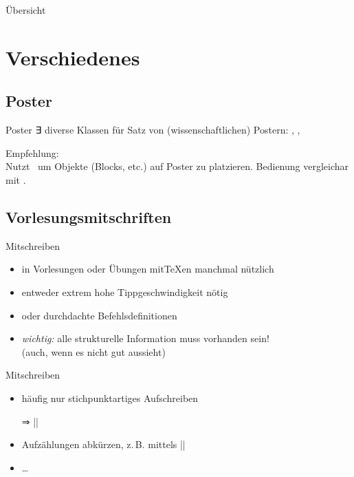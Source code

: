 \documentclass[
	vorläufig=false,
	datum=2022-12-22,
	titel={Komplexe Makros und Befehle},
	web=true,
	max,
	aspectratio=1610,
]{../tex/latexkurs-slides}
\begin{document}
\begin{frame}{Übersicht}
	\tableofcontents
\end{frame}


\section{Verschiedenes}
\subsection{Poster}
\begin{frame}{Poster}
∃ diverse Klassen für Satz von (wissenschaftlichen) Postern: , , \\[1ex]\pause

Empfehlung: \\[1ex]

Nutzt	 \TikZ\ um Objekte (Blocks, etc.) auf Poster zu platzieren. Bedienung vergleichar mit .
\end{frame}

\subsection{Vorlesungsmitschriften}

\begin{frame}{Mitschreiben}
\begin{itemize}
	\item in Vorlesungen oder Übungen mit\TeX{}en manchmal nützlich
	\item entweder extrem hohe Tippgeschwindigkeit nötig
	\item oder durchdachte Befehlsdefinitionen
	\item \emph{wichtig:} alle strukturelle Information muss vorhanden sein!\\%
(auch, wenn es nicht gut aussieht)
\end{itemize} 
\end{frame}

\begin{frame}[fragile]{Mitschreiben}
\begin{itemize}
	\item häufig nur stichpunktartiges Aufschreiben
	\item[⇒] |\obeylines|
	\item Aufzählungen abkürzen, z.\,B. mittels |\let\+\item|
	\item …
\end{itemize}
\end{frame}
\end{document}
